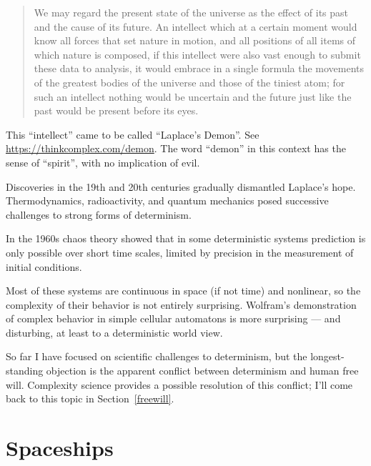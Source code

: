 \documentclass[12pt]{book}
\theoremstyle{exercise}
\begin{document}

\begin{quote}
We may regard the present state of the universe as the effect of its
past and the cause of its future. An intellect which at a certain
moment would know all forces that set nature in motion, and all
positions of all items of which nature is composed, if this intellect
were also vast enough to submit these data to analysis, it would
embrace in a single formula the movements of the greatest bodies of
the universe and those of the tiniest atom; for such an intellect
nothing would be uncertain and the future just like the past would be
present before its eyes.
\end{quote}

This ``intellect'' came to be called ``Laplace's Demon''.
See \url{https://thinkcomplex.com/demon}.  The word
``demon'' in this context has the sense of ``spirit'', with no
implication of evil.


Discoveries in the 19th and 20th centuries gradually dismantled
Laplace's hope.  Thermodynamics, radioactivity,
and quantum mechanics posed successive challenges to strong
forms of determinism.


In the 1960s chaos theory showed that in some deterministic systems
prediction is only possible over short time scales,  limited by
precision in the measurement of initial conditions.


Most of these systems are continuous in space (if not time) and
nonlinear, so the complexity of their behavior is not entirely
surprising.  Wolfram's demonstration of complex behavior in simple
cellular automatons is more surprising --- and disturbing, at least to a
deterministic world view.


So far I have focused on scientific challenges to determinism, but the
longest-standing objection is the apparent conflict between
determinism and human free will.  Complexity science provides
a possible resolution of this conflict; I'll come
back to this topic in Section~\ref{freewill}.



\section{Spaceships}
\label{spaceships}
\end{document}
